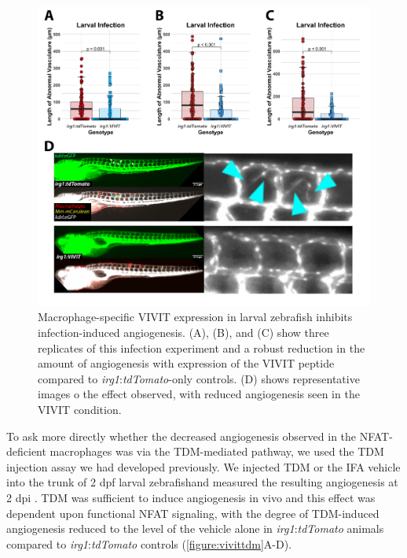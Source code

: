 \begin{figure}
\centering
\includegraphics[width=\textwidth]{images/vivitlinf.pdf}
\caption{Macrophage-specific VIVIT expression in larval zebrafish inhibits infection-induced angiogenesis. (A), (B), and (C) show three replicates of this infection experiment and a robust reduction in the amount of angiogenesis with expression of the VIVIT peptide compared to \textit{irg1}:\textit{tdTomato}-only controls. (D) shows representative images o the effect observed, with reduced angiogenesis seen in the VIVIT condition.}
\label{figure:vivitinf}
\end{figure}

To ask more directly whether the decreased angiogenesis observed in the NFAT-deficient macrophages was via the TDM-mediated pathway, we used the TDM injection assay we had developed previously. We injected TDM or the IFA vehicle into the trunk of 2 dpf larval zebrafishand measured the resulting angiogenesis at 2 dpi \citep{Walton2018}. TDM was sufficient to induce angiogenesis in vivo and this effect was dependent upon functional NFAT signaling, with the degree of TDM-induced angiogenesis reduced to the level of the vehicle alone in \textit{irg1}:\textit{tdTomato} animals compared to \textit{irg1}:\textit{tdTomato} controls (\autoref{figure:vivittdm}A-D).

